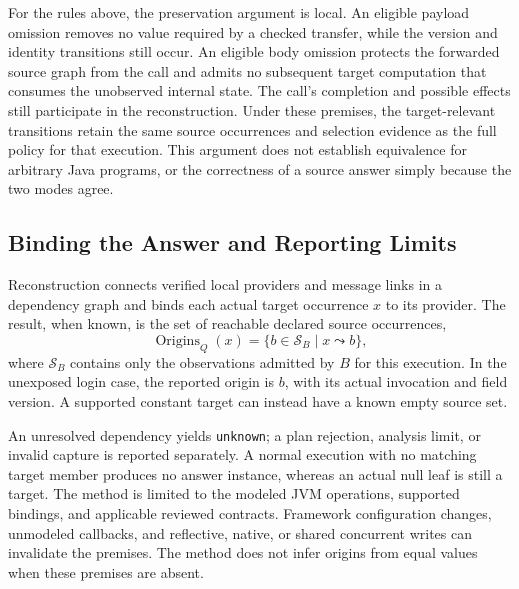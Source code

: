For the rules above, the preservation argument is local. An eligible
payload omission removes no value required by a checked transfer, while
the version and identity transitions still occur. An eligible body
omission protects the forwarded source graph from the call and admits no
subsequent target computation that consumes the unobserved internal state.
The call's completion and possible effects still participate in the
reconstruction. Under these premises, the target-relevant transitions
retain the same source occurrences and selection evidence as the full
policy for that execution. This argument does not establish equivalence
for arbitrary Java programs, or the correctness of a source answer simply
because the two modes agree.

\subsection{Binding the Answer and Reporting Limits}
\label{sec:method-graph}

Reconstruction connects verified local providers and message links in a
dependency graph and binds each actual target occurrence $x$ to its
provider. The result, when known, is the set of reachable declared source
occurrences,
\begin{equation}
    \operatorname{Origins}_Q(x)
      = \{b \in \mathcal{S}_B \mid x \leadsto b\},
    \label{eq:answer}
\end{equation}
where $\mathcal{S}_B$ contains only the observations admitted by $B$
for this execution. In the unexposed login case, the reported origin
is $b$, with its actual invocation and field version. A supported
constant target can instead have a known empty source set.

An unresolved dependency yields \texttt{unknown}; a plan rejection,
analysis limit, or invalid capture is reported separately. A normal
execution with no matching target member produces no answer instance,
whereas an actual null leaf is still a target. The method is limited to
the modeled JVM operations, supported bindings, and applicable reviewed
contracts. Framework configuration changes, unmodeled callbacks, and
reflective, native, or shared concurrent writes can invalidate the
premises. The method does not infer origins from equal values when
these premises are absent.

